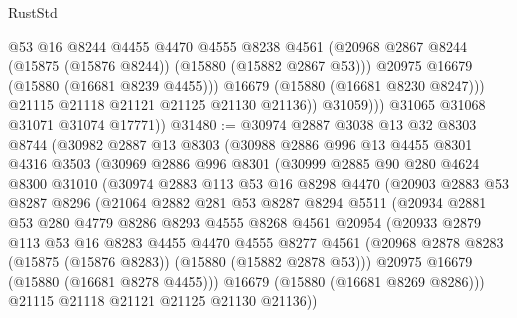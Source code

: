 \begin{lexlean}{RustStd}
\begin{coremodule}
                      @53
                      @16
                      @8244
                      @4455
                      @4470
                      @4555
                      @8238
                      @4561
                      (@20968 @2867 @8244 (@15875 (@15876 @8244)) (@15880 (@15882 @2867 @53)))
                      @20975
                      @16679
                      (@15880 (@16681 @8239 @4455)))
                    @16679
                    (@15880 (@16681 @8230 @8247)))
                  @21115
                  @21118
                  @21121
                  @21125
                  @21130
                  @21136))
              @31059)))
        @31065
        @31068
        @31071
        @31074
        @17771))
@31480 := @30974
    @2887
    @3038
    @13
    @32
    @8303
    @8744
    (@30982
      @2887
      @13
      @8303
      (@30988
        @2886
        @996
        @13
        @4455
        @8301
        @4316
        @3503
        (@30969
          @2886
          @996
          @8301
          (@30999
            @2885
            @90
            @280
            @4624
            @8300
            @31010
            (@30974
              @2883
              @113
              @53
              @16
              @8298
              @4470
              (@20903
                @2883
                @53
                @8287
                @8296
                (@21064
                  @2882
                  @281
                  @53
                  @8287
                  @8294
                  @5511
                  (@20934
                    @2881
                    @53
                    @280
                    @4779
                    @8286
                    @8293
                    @4555
                    @8268
                    @4561
                    @20954
                    (@20933
                      @2879
                      @113
                      @53
                      @16
                      @8283
                      @4455
                      @4470
                      @4555
                      @8277
                      @4561
                      (@20968 @2878 @8283 (@15875 (@15876 @8283)) (@15880 (@15882 @2878 @53)))
                      @20975
                      @16679
                      (@15880 (@16681 @8278 @4455)))
                    @16679
                    (@15880 (@16681 @8269 @8286)))
                  @21115
                  @21118
                  @21121
                  @21125
                  @21130
                  @21136))

\end{coremodule}
\end{lexlean}
